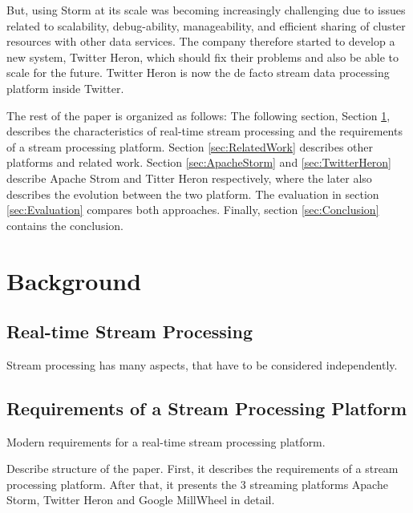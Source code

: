 \documentclass[conference]{IEEEtran}
\begin{document}
But, using Storm at its scale was becoming increasingly challenging due to issues related to scalability, debug-ability, manageability, and efficient sharing of cluster resources with other data services.
The company therefore started to develop a new system, Twitter Heron, which should fix their problems and also be able to scale for the future.
Twitter Heron is now the de facto stream data processing platform inside Twitter.

The rest of the paper is organized as follows: The following section, Section \ref{sec:Background}, describes the characteristics of real-time stream processing and the requirements of a stream processing platform.
Section \ref{sec:RelatedWork} describes other platforms and related work.
Section \ref{sec:ApacheStorm} and \ref{sec:TwitterHeron} describe Apache Strom and Titter Heron respectively, where the later also describes the evolution between the two platform.
The evaluation in section \ref{sec:Evaluation} compares both approaches.
Finally, section \ref{sec:Conclusion} contains the conclusion.

\section{Background}
\label{sec:Background}

\subsection{Real-time Stream Processing}
\label{sec:RealTimeStreamProcessing}

Stream processing has many aspects, that have to be considered independently.

\subsection{Requirements of a Stream Processing Platform}
\label{sec:RequirementsOfAStreamProcessingPlatform}

Modern requirements for a real-time stream processing platform.

\cite{The8Requirements}
\cite{ElasticScalingStreamProcessing}
\cite{OnlyOneLook}
\cite{YARN}
\cite{ScalableDistributedStreamProcessing}

Describe structure of the paper.
First, it describes the requirements of a stream processing platform.
After that, it presents the 3 streaming platforms Apache Storm, Twitter Heron and Google MillWheel in detail.
\end{document}
